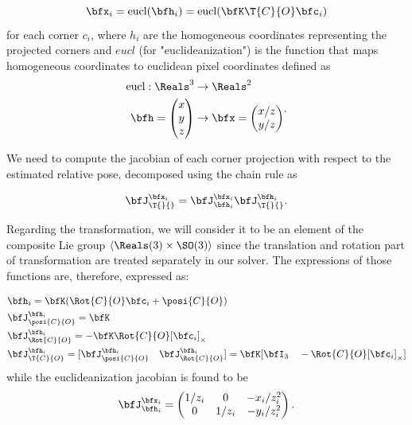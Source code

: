 \begin{equation}
    \bfx_i = \text{eucl}(\bfh_i) = \text{eucl}(\bfK\T{C}{O} \bfc_i)
\end{equation}
%
for each corner $c_i$, where $h_i$ are the homogeneous coordinates representing the projected corners and $eucl$ (for "euclideanization") is the function that maps 
homogeneous coordinates to euclidean pixel coordinates defined as
%
\begin{equation}
    \begin{split}
        \text{eucl}: \Reals^3 
        &\rightarrow \Reals^2 \\
        \bfh = \begin{pmatrix}x\\y\\z\end{pmatrix} 
        &\rightarrow \bfx = \begin{pmatrix}x/z\\y/z\end{pmatrix}
    \end{split}.
\end{equation}

We need to compute the jacobian of each corner projection with respect to the estimated relative pose, decomposed using the chain rule as  

\begin{equation}
    \bfJ^{\bfx_i}_{\T{}{}} = \bfJ^{\bfx_i}_{\bfh_i} \bfJ^{\bfh_i}_{\T{}{}}.   
\end{equation}

Regarding the transformation, we will consider it to be an element of the composite Lie group $\left<\Reals(3)\times \SO(3)\right>$ since the translation and rotation part 
of transformation are treated separately in our solver. The expressions of those functions are, therefore, expressed as:

\begin{equation}
    \begin{split}
        &\bfh_i = \bfK(\Rot{C}{O}\bfc_i + \posi{C}{O}) \\
        &\bfJ^{\bfh_i}_{\posi{C}{O}} = \bfK ~~~~~~ \\ &\bfJ^{\bfh_i}_{\Rot{C}{O}} = -\bfK\Rot{C}{O}[\bfc_i]_{\times}  \\  
        &\bfJ^{\bfh_i}_{\T{C}{O}} = [\bfJ^{\bfh_i}_{\posi{C}{O}} ~~~ \bfJ^{\bfh_i}_{\Rot{C}{O}}] = \bfK [\bfI_3 ~~~ -\Rot{C}{O} [\bfc_i]_{\times}]
    \end{split}
\end{equation}
%
while the euclideanization jacobian is found to be
\begin{equation}
    \bfJ^{\bfx_i}_{\bfh_i}
    =
    \begin{pmatrix}
    1/z_i & 0 & -x_i/z_i^2 \\
    0 & 1/z_i & -y_i/z_i^2
    \end{pmatrix}.
\end{equation}

